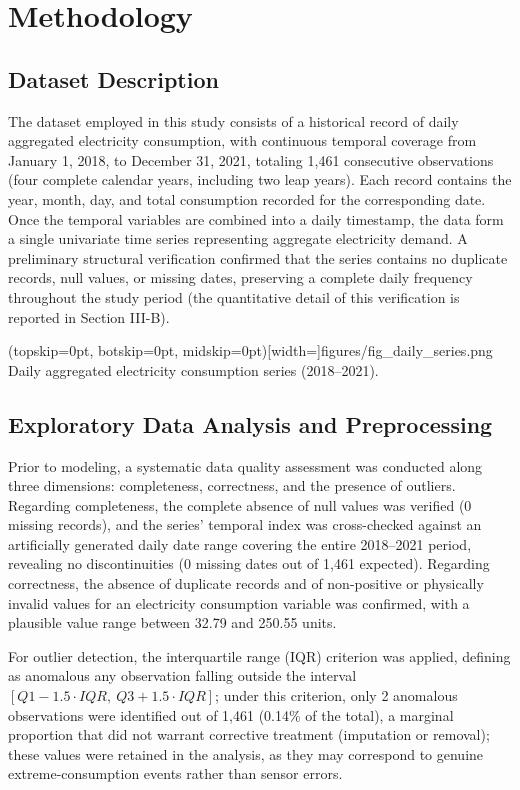 \documentclass{ieeeaccess}
\begin{document}
\section{Methodology}
\label{sec:methodology}
\subsection{Dataset Description}
The dataset employed in this study consists of a historical record of daily aggregated electricity consumption, with continuous temporal coverage from January 1, 2018, to December 31, 2021, totaling 1,461 consecutive observations (four complete calendar years, including two leap years). Each record contains the year, month, day, and total consumption recorded for the corresponding date. Once the temporal variables are combined into a daily timestamp, the data form a single univariate time series representing aggregate electricity demand. A preliminary structural verification confirmed that the series contains no duplicate records, null values, or missing dates, preserving a complete daily frequency throughout the study period (the quantitative detail of this verification is reported in Section III-B).

\Figure[t!](topskip=0pt, botskip=0pt, midskip=0pt)[width=\textwidth]{figures/fig_daily_series.png}
{Daily aggregated electricity consumption series (2018--2021).\label{fig_daily_series}}

\subsection{Exploratory Data Analysis and Preprocessing}
Prior to modeling, a systematic data quality assessment was conducted along three dimensions: completeness, correctness, and the presence of outliers. Regarding completeness, the complete absence of null values was verified (0 missing records), and the series' temporal index was cross-checked against an artificially generated daily date range covering the entire 2018--2021 period, revealing no discontinuities (0 missing dates out of 1,461 expected). Regarding correctness, the absence of duplicate records and of non-positive or physically invalid values for an electricity consumption variable was confirmed, with a plausible value range between 32.79 and 250.55 units.

For outlier detection, the interquartile range (IQR) criterion was applied, defining as anomalous any observation falling outside the interval $[Q1 - 1.5\cdot IQR,\ Q3 + 1.5\cdot IQR]$; under this criterion, only 2 anomalous observations were identified out of 1,461 (0.14\% of the total), a marginal proportion that did not warrant corrective treatment (imputation or removal); these values were retained in the analysis, as they may correspond to genuine extreme-consumption events rather than sensor errors.
\end{document}
